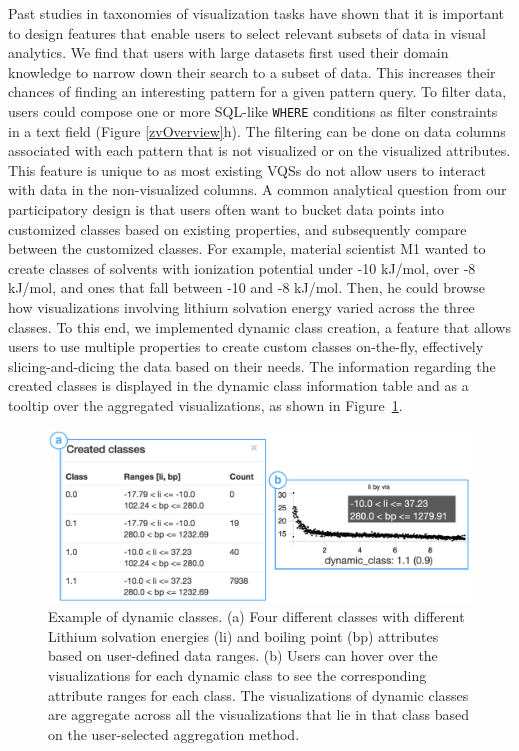 Past studies in taxonomies of visualization tasks have shown that it is important to design features that enable users to select relevant subsets of data in visual analytics\cite{Amar2005,Heer2012}. We find that users with large datasets first used their domain knowledge to narrow down their search to a subset of data. This increases their chances of finding an interesting pattern for a given pattern query. To filter data, users could compose one or more SQL-like \texttt{WHERE} conditions as filter constraints in a text field (Figure \ref{zvOverview}h). The filtering can be done on data columns associated with each pattern that is not visualized or on the visualized attributes. This feature is unique to \zv as most existing VQSs do not allow users to interact with data in the non-visualized columns.
A common analytical question from our participatory design is that users often want to bucket data points into customized classes based on existing properties, and subsequently compare between the customized classes. For example, material scientist M1 wanted to create classes of solvents with ionization potential under -10 kJ/mol, over -8 kJ/mol, and ones that fall between -10 and -8 kJ/mol. Then, he could browse how visualizations involving lithium solvation energy varied across the three classes. To this end, we implemented dynamic class creation, a feature that allows users to use multiple properties to create custom classes on-the-fly, effectively slicing-and-dicing the data based on their needs. The information regarding the created classes is displayed in the dynamic class information table and as a tooltip over the aggregated visualizations, as shown in Figure~\ref{dcc}.
\begin{figure}[h!]
\centering
\includegraphics[width=\linewidth]{figures/dcc_example.pdf}
\vspace{-6pt}
\caption{Example of dynamic classes. (a) Four different classes with different Lithium solvation energies (li) and boiling point (bp) attributes based on user-defined data ranges. (b) Users can hover over the visualizations for each dynamic class to see the corresponding attribute ranges for each class. The visualizations of dynamic classes are aggregate across all the visualizations that lie in that class based on the user-selected aggregation method.}
\label{dcc}
\vspace{-10pt}
\end{figure}
